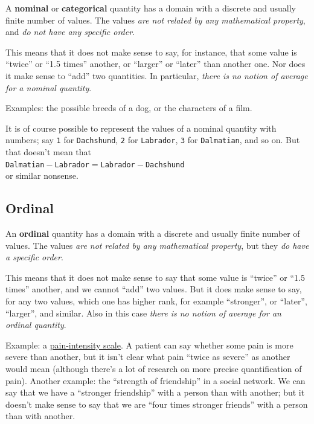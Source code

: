 \documentclass[
  a4paper,
  DIV=11,
  numbers=noendperiod,
  oneside]{scrreprt}
\begin{document}
A {\textbf{nominal}} or {\textbf{categorical}} quantity has a domain
with a discrete and usually finite number of values. The values
{\emph{are not related by any mathematical property}}, and {\emph{do not
have any specific order}}.

This means that it does not make sense to say, for instance, that some
value is ``twice'' or ``1.5 times'' another, or ``larger'' or ``later''
than another one. Nor does it make sense to ``add'' two quantities. In
particular, {\emph{there is no notion of average for a nominal
quantity}}.

Examples: the possible breeds of a dog, or the characters of a film.

It is of course possible to represent the values of a nominal quantity
with numbers; say \texttt{1} for \texttt{Dachshund}, \texttt{2} for
\texttt{Labrador}, \texttt{3} for \texttt{Dalmatian}, and so on. But
that doesn't mean that\\
\texttt{Dalmatian}\({}-{}\)\texttt{Labrador}\({}={}\)\texttt{Labrador}\({}-{}\)\texttt{Dachshund}\\
or similar nonsense.

\hypertarget{ordinal}{%
\subsection{Ordinal}\label{ordinal}}

An {\textbf{ordinal}} quantity has a domain with a discrete and usually
finite number of values. The values {\emph{are not related by any
mathematical property}}, but they {\emph{do have a specific order}}.

This means that it does not make sense to say that some value is
``twice'' or ``1.5 times'' another, and we cannot ``add'' two values.
But it does make sense to say, for any two values, which one has higher
rank, for example ``stronger'', or ``later'', ``larger'', and similar.
Also in this case {\emph{there is no notion of average for an ordinal
quantity}}.

Example: a
\href{https://doi.org/10.1016/j.jpainsymman.2004.08.007}{pain-intensity
scale}. A patient can say whether some pain is more severe than another,
but it isn't clear what pain ``twice as severe'' as another would mean
(although there's a lot of research on more precise quantification of
pain). Another example: the ``strength of friendship'' in a social
network. We can say that we have a ``stronger friendship'' with a person
than with another; but it doesn't make sense to say that we are ``four
times stronger friends'' with a person than with another.
\end{document}
